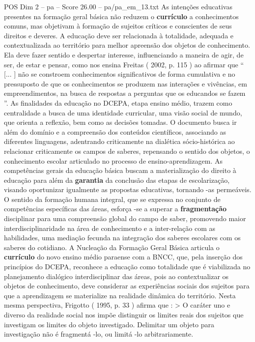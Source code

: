 \begin{textsample}{POS Dim 2 – pa – Score 26.00 – pa/pa\_em\_13.txt}
As intenções educativas presentes na formação geral básica não reduzem o \textbf{currículo} a conhecimentos comuns, mas objetivam à formação de sujeitos críticos e conscientes de seus direitos e deveres.
A educação deve ser relacionada à totalidade, adequada e contextualizada ao território para melhor apreensão dos objetos de conhecimento.
Ela deve fazer sentido e despertar interesse, influenciando a maneira de agir, de ser, de estar e pensar, como nos ensina Freitas ( 2002, p. 115 ) ao afirmar que “ [... ] não se constroem conhecimentos significativos de forma cumulativa e no pressuposto de que os conhecimentos se produzem nas interações e vivências, em empreendimentos, na busca de respostas a perguntas que os educandos se fazem ”.
As finalidades da educação no DCEPA, etapa ensino médio, trazem como centralidade a busca de uma identidade curricular, uma visão social de mundo, que orienta a reflexão, bem como as decisões tomadas.
O documento busca ir além do domínio e a compreensão dos conteúdos científicos, associando as diferentes linguagens, adentrando criticamente na dialética sócio-histórica ao relacionar criticamente os campos de saberes, repensando o sentido dos objetos, o conhecimento escolar articulado no processo de ensino-aprendizagem.
As competências gerais da educação básica buscam a materialização do direito à educação para além da \textbf{garantia} da conclusão das etapas de escolarização, visando oportunizar igualmente as propostas educativas, tornando -as permeáveis.
O sentido da formação humana integral, que se expressa no conjunto de competências específicas das áreas, esforça -se a superar a \textbf{fragmentação} disciplinar para uma compreensão global do campo de saber, promovendo maior interdisciplinaridade na área de conhecimento e a inter-relação com as habilidades, uma mediação fecunda na integração dos saberes escolares com os saberes do cotidiano.
A Nucleação da Formação Geral Básica articula o \textbf{currículo} do novo ensino médio paraense com a BNCC, que, pela inserção dos princípios do DCEPA, reconhece a educação como totalidade que é viabilizada no planejamento dialógico interdisciplinar das áreas, pois ao contextualizar os objetos de conhecimento, deve considerar as experiências sociais dos sujeitos para que a aprendizagem se materialize na realidade dinâmica do território.
Nesta mesma perspectiva, Frigotto ( 1995, p. 33 ) afirma que : > O caráter uno e diverso da realidade social nos impõe distinguir os limites reais dos sujeitos que investigam os limites do objeto investigado.
Delimitar um objeto para investigação não é fragmentá -lo, ou limitá -lo arbitrariamente.

\end{textsample}
